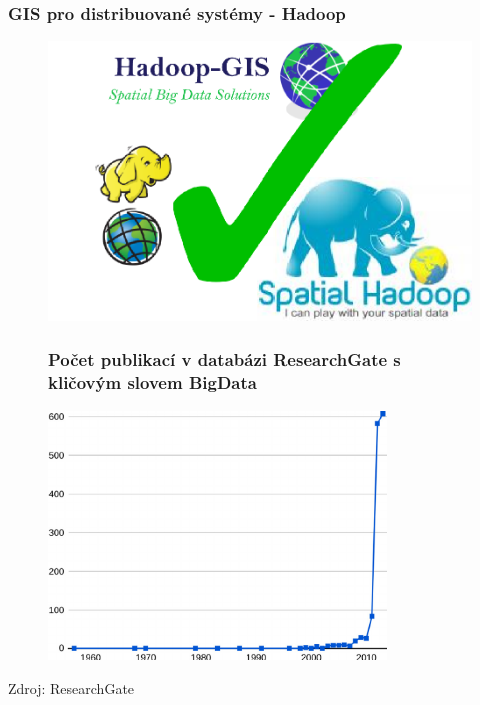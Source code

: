 \documentclass[unicode,bookmarksnumbered]{beamer}
\begin{document}
	\begin{frame}
		\frametitle{GIS pro distribuované systémy - Hadoop}
		\begin{figure}
			\centering
			\includegraphics[width=1\textwidth]{./img/motivace/yes.png}
			\label{fig:eu_all}
		\end{figure}
	\end{frame}
%
	\begin{frame}
		\begin{figure}
			\frametitle{Počet publikací v databázi ResearchGate s kličovým slovem BigData}
			\centering
			\includegraphics[width=0.8\textwidth]{./img/motivace/num_of_publication.png}
			\label{fig:num_of_publication}
		\end{figure}
		Zdroj: ResearchGate
	\end{frame}
%
\end{document}
